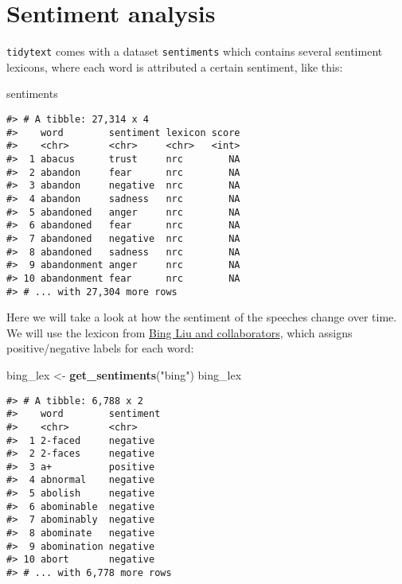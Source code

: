 \documentclass[]{book}
\newenvironment{Shaded}{\begin{snugshade}}{\end{snugshade}}
\newcommand{\KeywordTok}[1]{\textcolor[rgb]{0.13,0.29,0.53}{\textbf{#1}}}
\newcommand{\NormalTok}[1]{#1}
\newcommand{\StringTok}[1]{\textcolor[rgb]{0.31,0.60,0.02}{#1}}
\begin{document}
\hypertarget{sentiment-analysis}{%
\section{Sentiment analysis}\label{sentiment-analysis}}

\texttt{tidytext} comes with a dataset \texttt{sentiments} which contains several sentiment lexicons, where each word is attributed a certain sentiment, like this:

\begin{Shaded}
\begin{Highlighting}[]
\NormalTok{sentiments}
\end{Highlighting}
\end{Shaded}

\begin{verbatim}
#> # A tibble: 27,314 x 4
#>    word        sentiment lexicon score
#>    <chr>       <chr>     <chr>   <int>
#>  1 abacus      trust     nrc        NA
#>  2 abandon     fear      nrc        NA
#>  3 abandon     negative  nrc        NA
#>  4 abandon     sadness   nrc        NA
#>  5 abandoned   anger     nrc        NA
#>  6 abandoned   fear      nrc        NA
#>  7 abandoned   negative  nrc        NA
#>  8 abandoned   sadness   nrc        NA
#>  9 abandonment anger     nrc        NA
#> 10 abandonment fear      nrc        NA
#> # ... with 27,304 more rows
\end{verbatim}

Here we will take a look at how the sentiment of the speeches change over time. We will use the lexicon from \href{https://www.cs.uic.edu/~liub/FBS/sentiment-analysis.html}{Bing Liu and collaborators}, which assigns positive/negative labels for each word:

\begin{Shaded}
\begin{Highlighting}[]
\NormalTok{bing_lex <-}\StringTok{ }\KeywordTok{get_sentiments}\NormalTok{(}\StringTok{"bing"}\NormalTok{)}
\NormalTok{bing_lex}
\end{Highlighting}
\end{Shaded}

\begin{verbatim}
#> # A tibble: 6,788 x 2
#>    word        sentiment
#>    <chr>       <chr>    
#>  1 2-faced     negative 
#>  2 2-faces     negative 
#>  3 a+          positive 
#>  4 abnormal    negative 
#>  5 abolish     negative 
#>  6 abominable  negative 
#>  7 abominably  negative 
#>  8 abominate   negative 
#>  9 abomination negative 
#> 10 abort       negative 
#> # ... with 6,778 more rows
\end{verbatim}
\end{document}
